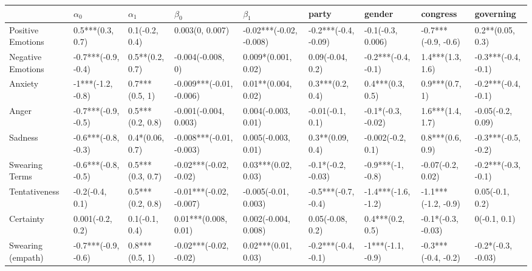 \begin{tabular}{lllllllll}
\toprule
{} &           $\alpha_0$ &         $\alpha_1$ &                 $\beta_0$ &                $\beta_1$ &                 party &               gender &             congress &            governing \\
\midrule
Positive Emotions     &     0.5***(0.3, 0.7) &     0.1(-0.2, 0.4) &           0.003(0, 0.007) &  -0.02***(-0.02, -0.008) &  -0.2***(-0.4, -0.09) &    -0.1(-0.3, 0.006) &  -0.7***(-0.9, -0.6) &     0.2**(0.05, 0.3) \\
Negative Emotions     &  -0.7***(-0.9, -0.4) &    0.5**(0.2, 0.7) &         -0.004(-0.008, 0) &      0.009*(0.001, 0.02) &      0.09(-0.04, 0.2) &  -0.2***(-0.4, -0.1) &     1.4***(1.3, 1.6) &  -0.3***(-0.4, -0.1) \\
Anxiety               &    -1***(-1.2, -0.8) &     0.7***(0.5, 1) &  -0.009***(-0.01, -0.006) &      0.01**(0.004, 0.02) &      0.3***(0.2, 0.4) &     0.4***(0.3, 0.5) &       0.9***(0.7, 1) &  -0.2***(-0.4, -0.1) \\
Anger                 &  -0.7***(-0.9, -0.5) &   0.5***(0.2, 0.8) &     -0.001(-0.004, 0.003) &      0.004(-0.003, 0.01) &      -0.01(-0.1, 0.1) &   -0.1*(-0.3, -0.02) &     1.6***(1.4, 1.7) &    -0.05(-0.2, 0.09) \\
Sadness               &  -0.6***(-0.8, -0.3) &    0.4*(0.06, 0.7) &  -0.008***(-0.01, -0.003) &      0.005(-0.003, 0.01) &      0.3**(0.09, 0.4) &    -0.002(-0.2, 0.1) &     0.8***(0.6, 0.9) &  -0.3***(-0.5, -0.2) \\
Swearing Terms        &  -0.6***(-0.8, -0.5) &   0.5***(0.3, 0.7) &    -0.02***(-0.02, -0.02) &      0.03***(0.02, 0.03) &    -0.1*(-0.2, -0.03) &    -0.9***(-1, -0.8) &    -0.07(-0.2, 0.02) &  -0.2***(-0.3, -0.1) \\
Tentativeness         &      -0.2(-0.4, 0.1) &   0.5***(0.2, 0.8) &   -0.01***(-0.02, -0.007) &     -0.005(-0.01, 0.003) &   -0.5***(-0.7, -0.4) &  -1.4***(-1.6, -1.2) &  -1.1***(-1.2, -0.9) &      0.05(-0.1, 0.2) \\
Certainty             &     0.001(-0.2, 0.2) &     0.1(-0.1, 0.4) &      0.01***(0.008, 0.01) &     0.002(-0.004, 0.008) &      0.05(-0.08, 0.2) &     0.4***(0.2, 0.5) &   -0.1*(-0.3, -0.03) &         0(-0.1, 0.1) \\
Swearing (empath)     &  -0.7***(-0.9, -0.6) &     0.8***(0.5, 1) &    -0.02***(-0.02, -0.02) &      0.02***(0.01, 0.03) &   -0.2***(-0.4, -0.1) &    -1***(-1.1, -0.9) &  -0.3***(-0.4, -0.2) &   -0.2*(-0.3, -0.03) \\

\end{tabular}
